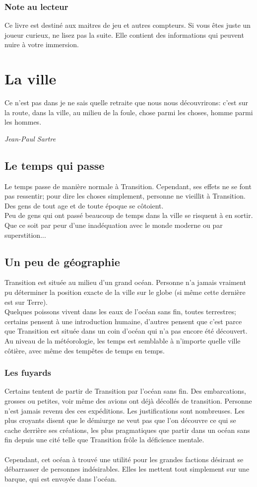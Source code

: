 \documentclass{book}
\begin{document}
\subsection*{Note au lecteur}
Ce livre est destiné aux maitres de jeu et autres compteurs. Si vous êtes juste un joueur curieux, ne lisez pas la suite. Elle contient des informations qui peuvent nuire à votre immersion.

\chapter{La ville}
\epigraph{Ce n'est pas dans je ne sais quelle retraite que nous nous découvrirons: c'est sur la route, dans la ville, au milieu de la foule, chose parmi les choses, homme parmi les hommes.}{\textit{Jean-Paul Sartre}}
\section{Le temps qui passe}
Le temps passe de manière normale à Transition. Cependant, ses effets ne se font pas ressentir; pour dire les choses simplement, personne ne vieillit à Transition. Des gens de tout age et de toute époque se côtoient.\\
Peu de gens qui ont passé beaucoup de temps dans la ville se risquent à en sortir. Que ce soit par peur d'une inadéquation avec le monde moderne ou par superstition...

\section{Un peu de géographie}
Transition est située au milieu d'un grand océan. Personne n'a jamais vraiment pu déterminer la position exacte de la ville sur le globe (si même cette dernière est sur Terre).\\
Quelques poissons vivent dans les eaux de l'océan sans fin, toutes terrestres; certains pensent à une introduction humaine, d'autres pensent que c'est parce que Transition est située dans un coin d'océan qui n'a pas encore été découvert.\\
Au niveau de la météorologie, les temps est semblable à n'importe quelle ville côtière, avec même des tempêtes de temps en temps.

\subsection{Les fuyards}
Certains tentent de partir de Transition par l'océan sans fin. Des embarcations, grosses ou petites, voir même des avions ont déjà décollés de transition. Personne n'est jamais revenu des ces expéditions. Les justifications sont nombreuses. Les plus croyants disent que le démiurge ne veut pas que l'on découvre ce qui se cache derrière ses créations, les plus pragmatiques que partir dans un océan sans fin depuis une cité telle que Transition frôle la déficience mentale.
\\
\\
Cependant, cet océan à trouvé une utilité pour les grandes factions désirant se débarrasser de personnes indésirables. Elles les mettent tout simplement sur une barque, qui est envoyée dans l'océan.
\end{document}
